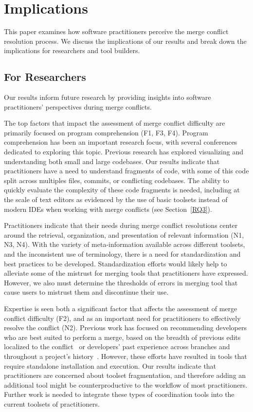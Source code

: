 \section{Implications}\label{implications}
This paper examines how software practitioners perceive the merge conflict resolution process.
We discuss the implications of our results and break down the implications for researchers and tool builders.

\subsection{For Researchers}
Our results inform future research by providing insights into software practitioners' perspectives during merge conflicts.

The top factors that impact the assessment of merge conflict difficulty are primarily focused on program comprehension (F1, F3, F4).
Program comprehension has been an important research focus, with several conferences dedicated to exploring this topic.
Previous research has explored visualizing and understanding both small and large codebases.
Our results indicate that practitioners have a need to understand fragments of code, with some of this code split across multiples files, commits, or conflicting codebases.
The ability to quickly evaluate the complexity of these code fragments is needed, including at the scale of text editors as evidenced by the use of basic toolsets instead of modern IDEs when working with merge conflicts (see Section~\ref{RQ3}).

Practitioners indicate that their needs during merge conflict resolutions center around the retrieval, organization, and presentation of relevant information (N1, N3, N4).
With the variety of meta-information available across different toolsets, and the inconsistent use of terminology, there is a need for standardization and best practices to be developed.
Standardization efforts would likely help to alleviate some of the mistrust for merging tools that practitioners have expressed.
However, we also must determine the thresholds of errors in merging tool that cause users to mistrust them and discontinue their use.

Expertise is seen both a significant factor that affects the assessment of merge conflict difficulty (F2), and as an important need for practitioners to effectively resolve the conflict (N2).
Previous work has focused on recommending developers who are best suited to perform a merge, based on the breadth of previous edits localized to the conflict~\cite{dasilva2015niche} or developers' past experience across branches and throughout a project's history~\cite{CostaSarma}.
However, these efforts have resulted in tools that require standalone installation and execution.
Our results indicate that practitioners are concerned about toolset fragmentation, and therefore adding an additional tool might be counterproductive to the workflow of most practitioners.
Further work is needed to integrate these types of coordination tools into the current toolsets of practitioners.

